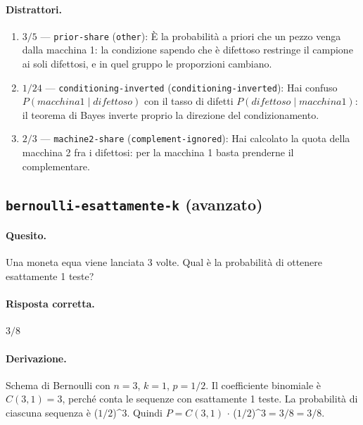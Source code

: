 \paragraph{Distrattori.}
\begin{enumerate}
  \item $3/5$ --- \texttt{prior-share} (\texttt{other}): È la probabilità a priori che un pezzo venga dalla macchina 1: la condizione \guillemotleft{}sapendo che è difettoso\guillemotright{} restringe il campione ai soli difettosi, e in quel gruppo le proporzioni cambiano.
  \item $1/24$ --- \texttt{conditioning-inverted} (\texttt{conditioning-inverted}): Hai confuso $P(macchina 1 \mid  difettoso)$ con il tasso di difetti $P(difettoso \mid  macchina 1)$: il teorema di Bayes inverte proprio la direzione del condizionamento.
  \item $2/3$ --- \texttt{machine2-share} (\texttt{complement-ignored}): Hai calcolato la quota della macchina 2 fra i difettosi: per la macchina 1 basta prenderne il complementare.
\end{enumerate}

\subsection{\texorpdfstring{\texttt{bernoulli-esattamente-k} (avanzato)}{bernoulli-esattamente-k (avanzato)}}

\paragraph{Quesito.} Una moneta equa viene lanciata 3 volte. Qual è la probabilità di ottenere esattamente 1 teste?

\paragraph{Risposta corretta.} $3/8$

\paragraph{Derivazione.} Schema di Bernoulli con $n = 3$, $k = 1$, $p = 1/2$. Il coefficiente binomiale è $C(3,1) = 3$, perché conta le sequenze con esattamente 1 teste. La probabilità di ciascuna sequenza è ($1/2$)\textasciicircum{}3. Quindi $P = C(3,1)$ $\cdot$ ($1/2$)\textasciicircum{}$3 = 3/8 = 3/8$.

